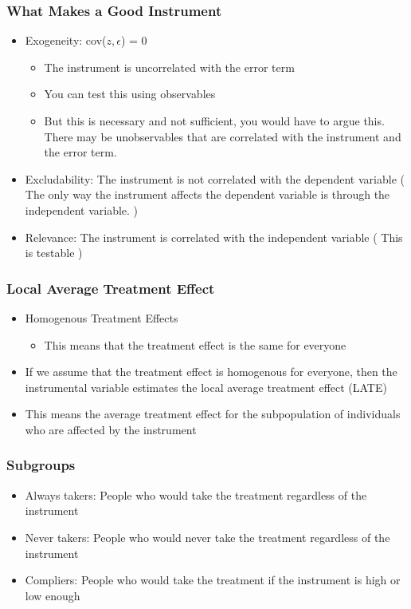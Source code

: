 \documentclass[serif, 9pt, aspectratio=32]{beamer}
\begin{document}
\begin{frame}
    \frametitle{What Makes a Good Instrument}
    \begin{itemize}
        \setlength{\itemsep}{2em}
        \item Exogeneity: cov(\(z, \epsilon\)) = 0
              \begin{itemize}
                  \item The instrument is uncorrelated with the error term
                  \item You can test this using observables
                  \item But this is necessary and not sufficient, you would have to argue this. There may be unobservables that are correlated with the instrument and the error term.
              \end{itemize}
        \item Excludability: The instrument is not correlated with the dependent variable ( The only way the instrument affects the dependent variable is through the independent variable. )
        \item Relevance: The instrument is correlated with the independent variable ( This is testable )
    \end{itemize}
\end{frame}

\begin{frame}
    \frametitle{Local Average Treatment Effect}
    \begin{itemize}
        \setlength{\itemsep}{2em}
        \item Homogenous Treatment Effects
              \begin{itemize}
                  \item This means that the treatment effect is the same for everyone
              \end{itemize}
        \item If we assume that the treatment effect is homogenous for everyone, then the instrumental variable estimates the local average treatment effect (LATE)
        \item This means the average treatment effect for the subpopulation of individuals who are affected by the instrument
    \end{itemize}
\end{frame}

\begin{frame}
    \frametitle{Subgroups}
    \begin{itemize}
        \setlength{\itemsep}{2em}
        \item Always takers: People who would take the treatment regardless of the instrument
        \item Never takers: People who would never take the treatment regardless of the instrument
        \item Compliers: People who would take the treatment if the instrument is high or low enough
    \end{itemize}
\end{frame}
\end{document}
